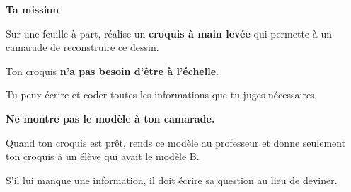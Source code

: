 \documentclass[10pt,a4paper]{article}
\begin{document}
\begin{minipage}[t]{0.485\linewidth}
\begin{tcolorbox}
\vfill

\textbf{Ta mission}

\medskip

Sur une feuille à part, réalise un \textbf{croquis à main levée}
qui permette à un camarade de reconstruire ce dessin.

\medskip

Ton croquis \textbf{n'a pas besoin d'être à l'échelle}.

\medskip

Tu peux écrire et coder toutes les informations
que tu juges nécessaires.

\medskip

\textbf{Ne montre pas le modèle à ton camarade.}

\vspace{0.3cm}

Quand ton croquis est prêt, rends ce modèle au professeur
et donne seulement ton croquis à un élève qui avait le modèle B.

\medskip

S'il lui manque une information,
il doit écrire sa question au lieu de deviner.

\end{tcolorbox}

\end{minipage}
\hfill
\end{document}
